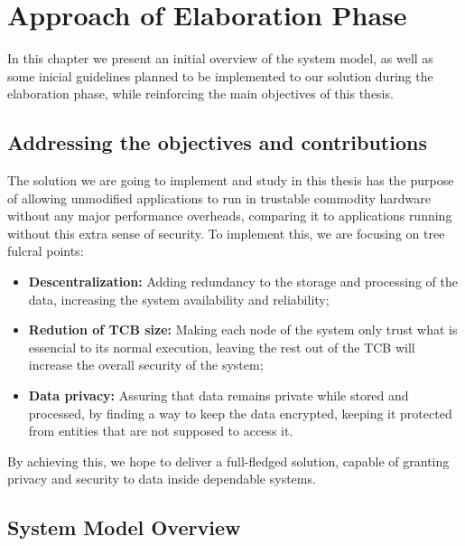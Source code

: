 \chapter{Approach of Elaboration Phase}
\label{cha:approach_of_elaboration_phase}

In this chapter we present an initial overview of the system model, as well as some inicial guidelines planned to be implemented to our solution during the elaboration phase, while reinforcing the main objectives of this thesis.

\section{Addressing the objectives and contributions} %
\label{sec:document_structure}

The solution we are going to implement and study in this thesis has the purpose of allowing unmodified applications to run in trustable commodity hardware without any major performance overheads, comparing it to applications running without this extra sense of security. To implement this, we are focusing on tree fulcral points:
\begin{itemize}
	\item \textbf{Descentralization:}  Adding redundancy to the storage and processing of the data, increasing the system availability and reliability;
	\item \textbf{Redution of TCB size:}  Making each node of the system only trust what is essencial to its normal execution, leaving the rest out of the TCB will increase the overall security of the system;
	\item \textbf{Data privacy:}  Assuring that data remains private while stored and processed, by finding a way to keep the data encrypted, keeping it protected from entities that are not supposed to access it.
\end{itemize}
By achieving this, we hope to deliver a full-fledged solution, capable of granting privacy and security to data inside dependable systems.




\section{System Model Overview} %
\label{sec:dealing_with_bibliogrpahy}

